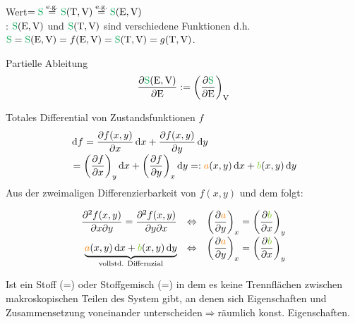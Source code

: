\begin{sectionbox}\nospacing
  \begin{numberlist}
      \item
    Wert$=\Spot\stackrel{\text{e.g.}}{=}\Spot(\Tz,\Vz)\stackrel{\text{e.g.}}{=}\Spot(\Ez,\Vz)$\\
    : $\Spot(\Ez,\Vz)$ und $\Spot(\Tz,\Vz)$ sind verschiedene
    Funktionen d.h.\\
    $\Spot=\Spot(\Ez,\Vz)=f(\Ez,\Vz)=\Spot(\Tz,\Vz)=g(\Tz,\Vz)$.
      \item Partielle Ableitung
        \begin{align*}
          \frac{\partial \Spot(\Ez,\Vz)}{\partial \Ez}:=\left(\frac{\partial \Spot}{\partial \Ez}\right)_{\Vz}
        \end{align*}
      \item Totales Differential von Zustandsfunktionen $f$
        \begin{align*}
          &\diff f=\pfrac{f(x,y)}{x}\diff x+\pfrac{f(x,y)}{y}\diff y\nalign
          &=\left(\pfrac{f}{x}\right)_y\diff x+\left(\pfrac{f}{y}\right)_x\diff y=:\mca(x,y)\diff x+\mcb(x,y)\diff y
        \end{align*}
        Aus der zweimaligen Differenzierbarkeit von $f(x,y)$ und dem  folgt:
        \begin{notebox}
          \begin{align*}
            \frac{\partial^2f(x,y)}{\partial x\partial y}=\frac{\partial^2f(x,y)}{\partial y\partial x}&&\Leftrightarrow&&
          \left(\pfrac{\mca}{y}\right)_x=\left(\pfrac{\mcb}{x}\right)_y\nalign
          \underbrace{\mca(x,y)\diff x+\mcb(x,y)\diff y}_{\text{vollstd. Differnzial}}&&\Leftrightarrow&&
           \left(\pfrac{\mca}{y}\right)_x=\left(\pfrac{\mcb}{x}\right)_y             
          \end{align*}
        \end{notebox}
  \end{numberlist}
\end{sectionbox}
\begin{defnbox}
  \begin{defn}[Phase]
    Ist ein Stoff (=) oder Stoffgemisch
    (=) in dem es keine Trennflächen zwischen
    makroskopischen Teilen des System gibt, an denen sich
    Eigenschaften und Zusammensetzung voneinander
    unterscheiden$\Rightarrow$räumlich konst. Eigenschaften.
  \end{defn}
\end{defnbox}
